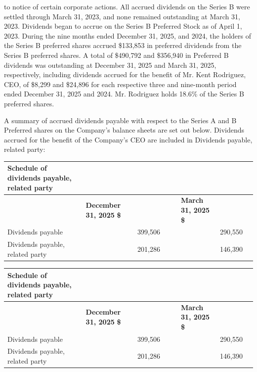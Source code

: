 \documentclass[11pt,a4paper]{article}
\begin{document}
to notice of certain corporate actions. All accrued dividends on the Series B were settled through March 31, 2023, and none remained outstanding at March 31, 2023. Dividends began to accrue on the Series B Preferred Stock as of April 1, 2023. During the nine months ended December 31, 2025, and 2024, the holders of the Series B preferred shares accrued \$133,853 in preferred dividends from the Series B preferred shares. A total of \$490,792 and \$356,940 in Preferred B dividends was outstanding at December 31, 2025 and March 31, 2025, respectively, including dividends accrued for the benefit of Mr. Kent Rodriguez, CEO, of \$8,299 and \$24,896 for each respective three and nine-month period ended December 31, 2025 and 2024. Mr. Rodriguez holds 18.6\% of the Series B preferred shares.

A summary of accrued dividends payable with respect to the Series A and B Preferred shares on the Company's balance sheets are set out below. Dividends accrued for the benefit of the Company's CEO are included in Dividends payable, related party:

\begin{table}[h]
\begin{tabular}{|l|l|l|l|l|l|l|l|l|}
\hline
Schedule of dividends payable, related party &  &  &  &  &  &  &  &  \\ \hline
 &  & \textbf{December 31, 2025}  \textbf{\$} &  &  &  & \textbf{March 31, 2025}  \textbf{\$} &  &  \\ \hline
Dividends payable &  &  & 399,506 &  &  &  & 290,550 &  \\ \hline
Dividends payable, related party &  &  & 201,286 &  &  &  & 146,390 &  \\ \hline
\end{tabular}
\end{table}

\begin{table}[h]
\begin{tabular}{|l|l|l|l|l|l|l|l|l|}
\hline
Schedule of dividends payable, related party &  &  &  &  &  &  &  &  \\ \hline
 &  & \textbf{December 31, 2025}  \textbf{\$} &  &  &  & \textbf{March 31, 2025}  \textbf{\$} &  &  \\ \hline
Dividends payable &  &  & 399,506 &  &  &  & 290,550 &  \\ \hline
Dividends payable, related party &  &  & 201,286 &  &  &  & 146,390 &  \\ \hline
\end{tabular}
\end{table}
\end{document}
